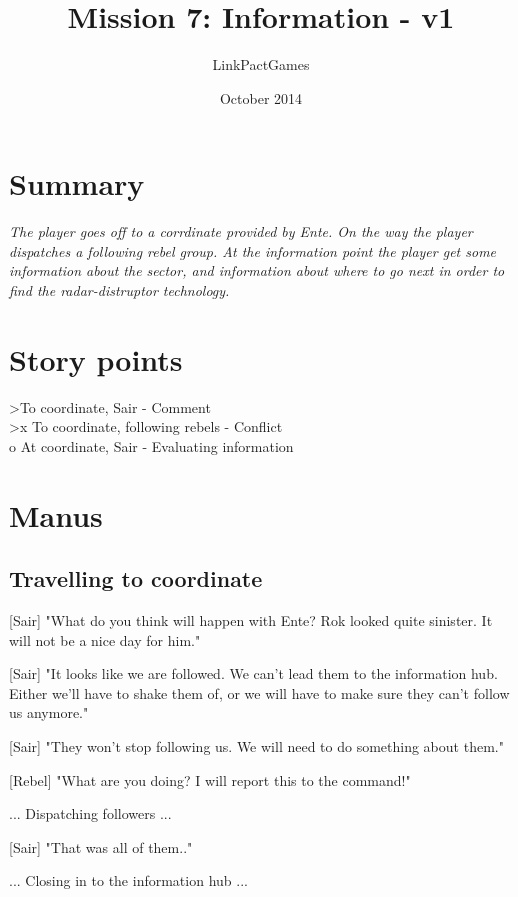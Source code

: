 \documentclass[a4paper,12pt]{article}
\begin{document}
\title{Mission 7: Information - v1}
\author{LinkPactGames}
\date{October 2014}
\maketitle

\section{Summary}

\textit{The player goes off to a corrdinate provided by Ente. On the way the player dispatches a following rebel group.
At the information point the player get some information about the sector, and information about where to go next
in order to find the radar-distruptor technology.}

\section{Story points}

\textgreater To coordinate, Sair - Comment\\
\textgreater x To coordinate, following rebels - Conflict\\
o At coordinate, Sair - Evaluating information

\section{Manus}

\subsection{Travelling to coordinate}

[Sair] "What do you think will happen with Ente? Rok looked quite sinister. It will not be a nice day for him."

[Sair] "It looks like we are followed. We can't lead them to the information hub. Either we'll have to shake them of, or we
will have to make sure they can't follow us anymore."

[Sair] "They won't stop following us. We will need to do something about them."

[Rebel] "What are you doing? I will report this to the command!"

... Dispatching followers ...

[Sair] "That was all of them.."

... Closing in to the information hub ...
\end{document}
